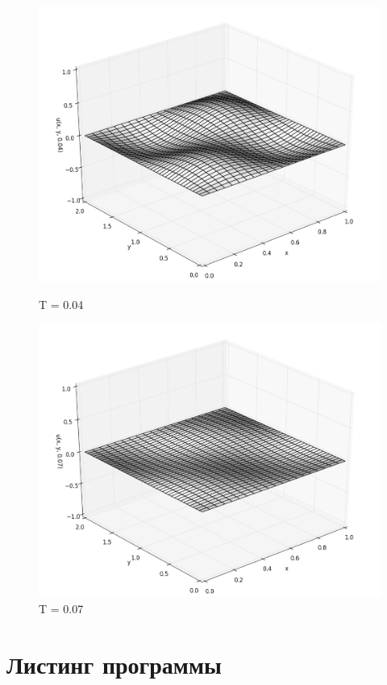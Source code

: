 \documentclass[12pt]{article}
\begin{document}
\begin{figure}[h!]
\begin{minipage}[h]{0.5\linewidth}
				\includegraphics[width=\linewidth]{solution_t04}
				\caption{T = 0.04}
			\end{minipage}
			\hfill
			\begin{minipage}[h]{0.5\linewidth}
				\includegraphics[width=\linewidth]{solution_t07}
				\caption{T = 0.07}
			\end{minipage}
		\end{figure}
	\section{Листинг программы}
	
	
\end{document}

